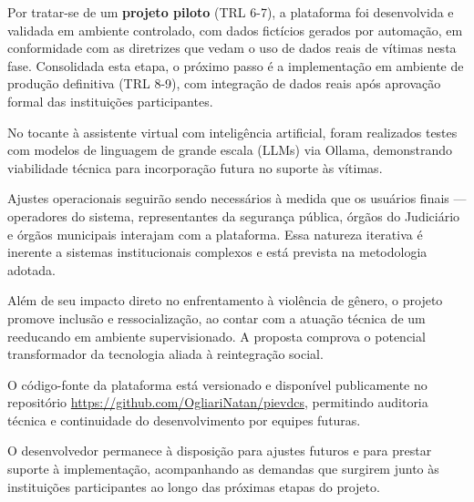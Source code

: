 \par Por tratar-se de um \textbf{projeto piloto} (TRL 6-7), a plataforma foi desenvolvida e validada em ambiente controlado, com dados fictícios gerados por automação, em conformidade com as diretrizes que vedam o uso de dados reais de vítimas nesta fase. Consolidada esta etapa, o próximo passo é a implementação em ambiente de produção definitiva (TRL 8-9), com integração de dados reais após aprovação formal das instituições participantes.

\par No tocante à assistente virtual com inteligência artificial, foram realizados testes com modelos de linguagem de grande escala (LLMs) via Ollama, demonstrando viabilidade técnica para incorporação futura no suporte às vítimas.

\par Ajustes operacionais seguirão sendo necessários à medida que os usuários finais — operadores do sistema, representantes da segurança pública, órgãos do Judiciário e órgãos municipais interajam com a plataforma. Essa natureza iterativa é inerente a sistemas institucionais complexos e está prevista na metodologia adotada.

\par Além de seu impacto direto no enfrentamento à violência de gênero, o projeto promove inclusão e ressocialização, ao contar com a atuação técnica de um reeducando em ambiente supervisionado. A proposta comprova o potencial transformador da tecnologia aliada à reintegração social.

\par O código-fonte da plataforma está versionado e disponível publicamente no repositório 
\href{https://github.com/OgliariNatan/pievdcs}{https://github.com/OgliariNatan/pievdcs}, 
permitindo auditoria técnica e continuidade do desenvolvimento por equipes futuras.

\par O desenvolvedor permanece à disposição para ajustes futuros e para prestar suporte à implementação, acompanhando as demandas que surgirem junto às instituições participantes ao longo das próximas etapas do projeto.